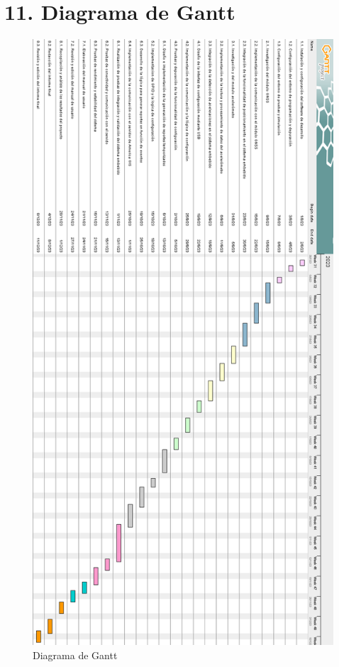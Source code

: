 \documentclass[
11pt, %
codirector, %
]{charter}
\begin{document}
\section{11. Diagrama de Gantt}
\label{sec:gantt}
\begin{figure}[htpb]
\centering 
\includegraphics[height=.72\textheight]{./Figuras/gantt_rotado.png}
\caption{Diagrama de Gantt}
\label{fig:diagGantt}
\end{figure}
\end{document}
